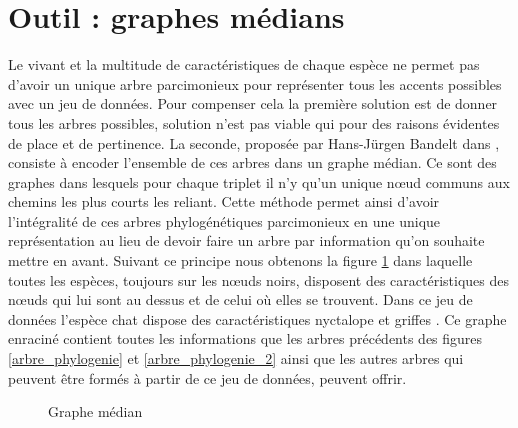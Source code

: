 \section{Outil : graphes médians}

Le vivant et la multitude de caractéristiques de chaque espèce ne permet pas d'avoir un unique arbre parcimonieux pour représenter tous les accents possibles avec un jeu de données. Pour compenser cela la première solution est de donner tous les arbres possibles, solution n'est pas viable qui pour des raisons évidentes de place et de pertinence. La seconde, proposée par Hans-Jürgen Bandelt dans \cite{MedianAlgebras}, consiste à encoder l'ensemble de ces arbres dans un graphe médian. Ce sont des graphes dans lesquels pour chaque triplet il n'y qu'un unique n\oe ud communs aux chemins les plus courts les reliant. Cette méthode permet ainsi d'avoir l'intégralité de ces arbres phylogénétiques parcimonieux en une unique représentation au lieu de devoir faire un arbre par information qu'on souhaite mettre en avant. Suivant ce principe nous obtenons la figure \ref{graphe_median_phylogenie} dans laquelle toutes les espèces, toujours sur les n\oe uds noirs, disposent des caractéristiques des n\oe uds qui lui sont au dessus et de celui où elles se trouvent. Dans ce jeu de données l'espèce \guillemotleft{} chat \guillemotright{} dispose des caractéristiques \guillemotleft{} nyctalope \guillemotright{} et \guillemotleft{} griffes \guillemotright{}. Ce graphe enraciné contient toutes les informations que les arbres précédents des figures \ref{arbre_phylogenie} et \ref{arbre_phylogenie_2} ainsi que les autres arbres qui peuvent être formés à partir de ce jeu de données, peuvent offrir.

\begin{figure}[H]
	\begin{center}
	\end{center}
	\caption{Graphe médian}
	\label{graphe_median_phylogenie}
\end{figure}

